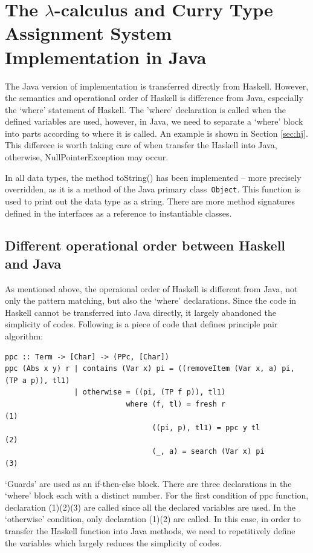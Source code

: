 \chapter{The $\lambda$-calculus and Curry Type Assignment System Implementation in Java}
The Java version of implementation is transferred directly from Haskell. However, the semantics and operational order of Haskell is difference from Java, especially the `where' statement of Haskell. The 'where' declaration is called when the defined variables are used, however, in Java, we need to separate a `where' block into parts according to where it is called. An example is shown in Section \ref{sec:hj}. This differece is worth taking care of when transfer the Haskell into Java, otherwise, NullPointerException may occur. 

In all data types, the method toString() has been implemented -- more precisely overridden, as it is a method of the Java primary class\verb| Object|. This function is used to print out the data type as a string. There are more method signatures defined in the interfaces as a reference to instantiable classes. 

\section{Different operational order between Haskell and Java}{\label{sec:hj}}
As mentioned above, the operaional order of Haskell is different from Java, not only the pattern matching, but also the `where' declarations. Since the code in Haskell cannot be transferred into Java directly, it largely abandoned the simplicity of codes. Following is a piece of code that defines principle pair algorithm:
\begin{verbatim}
ppc :: Term -> [Char] -> (PPc, [Char])
ppc (Abs x y) r | contains (Var x) pi = ((removeItem (Var x, a) pi, (TP a p)), tl1)
                | otherwise = ((pi, (TP f p)), tl1)
                            where (f, tl) = fresh r                    (1) 
                                  ((pi, p), tl1) = ppc y tl            (2)
                                  (_, a) = search (Var x) pi           (3)

\end{verbatim}

`Guards' are used as an if-then-else block. There are three declarations in the `where' block each with a distinct number. For the first condition of ppc function, declaration (1)(2)(3) are called since all the declared variables are used. In the `otherwise' condition, only declaration (1)(2) are called. In this case, in order to transfer the Haskell function into Java methods, we need to repetitively define the variables which largely reduces the simplicity of codes. 





